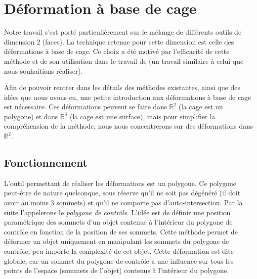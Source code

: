 

\chapter{Déformation à base de cage}

\graphicspath{ {Chapter2/Chapter2Figs/PNG/}
  {Chapter2/Chapter2Figs/PDF/} {Chapter2/Chapter2Figs/} }

Notre travail s'est porté particulièrement sur le mélange de différents outils
de dimension 2 (faces). La technique retenue pour cette dimension est celle des
déformations à base de cage. Ce choix a été motivé par l'efficacité de cette
méthode et de son utilisation dans le travail de \cite{GPCP13} (un travail
similaire à celui que nous souhaitions réaliser).

Afin de pouvoir rentrer dans les détails des méthodes existantes, ainsi que des
idées que nous avons eu, une petite introduction aux déformations à base de cage
est nécessaire. Ces déformations peuvent se faire dans $\mathbb{R}^2$ (la cage
est un polygone) et dans $\mathbb{R}^3$ (la cage est une surface), mais pour
simplifier la compréhension de la méthode, nous nous concentrerons sur des
déformations dans $\mathbb{R}^2$.

\section{Fonctionnement} 

L'outil permettant de réaliser les déformations est un polygone. Ce polygone
peut-être de nature quelconque, sous réserve qu'il ne soit pas dégénéré (il doit
avoir au moins 3 sommets) et qu'il ne comporte pas d'auto-intersection. Par
la suite l'appelerons le \textit{polygone de contrôle}. L'idée est de définir
une position paramétrique des sommets d'un objet contenus à l'intérieur du
polygone de contrôle en fonction de la position de ses sommets. Cette méthode
permet de déformer un objet uniquement en manipulant les sommets du polygone de
contrôle, peu importe la complexité de cet objet. Cette déformation est dite
globale, car un sommet du polygone de contrôle a une influence sur tous les
points de l'espace (sommets de l'objet) contenus à l'intérieur du polygone. \\

